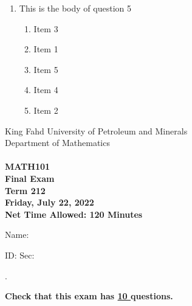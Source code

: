 \documentclass[amsfonts,bezier,leqno,fleqn,12pt,a4paper]{article}
\begin{document}
{\begin{large}
\begin{enumerate}
\begin{enumerate}
\end{enumerate}

\vspace {3.5cm}


\item This is the body of question 5
\vspace {0.3in}
\setcounter{equation}{0}

\begin{enumerate}
\item  Item 3
\item  Item 1
\item  Item 5
\item  Item 4
\item  Item 2

\end{enumerate}
\newpage


\end{enumerate}
\end{large}


\newpage


\thispagestyle{empty}
\begin{center}
    \begin{large}
        King Fahd University of Petroleum and Minerals \\ 
        Department of Mathematics  \\ 
        \vspace*{4.5cm}
        {\bf {} }  \hfill {\bf {}} \\
        {\bf MATH101 }  \\
        {\bf Final Exam }  \\
        {\bf Term 212 }  \\
        {\bf Friday, July 22, 2022 }  \\ 
        {\bf Net Time Allowed: 120 Minutes }  \\
        \vspace*{0.2cm}

    \end{large}
\end{center}

\large{Name:  }\hrulefill

\vspace{3mm}

\large{ID: } \hrulefill \large{  Sec: } \hrulefill \large{.

\vspace{1cm}

\large{\bf{Check that this exam has {\underline{ 10 }} questions.}}

\vspace{1cm}

}}
\end{document}
